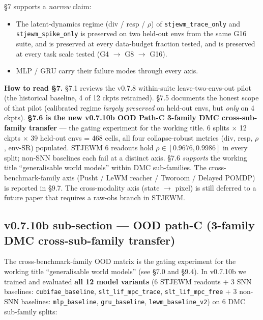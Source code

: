 \documentclass{article}
\begin{document}
§7 supports a \emph{narrow} claim:
\begin{itemize}
\item The latent-dynamics regime (div / resp / $\rho$) of \texttt{stjewm\_trace\_only}
and \texttt{stjewm\_spike\_only} is preserved on two held-out envs from the
same G16 suite, and is preserved at every data-budget fraction
tested, and is preserved at every task scale tested (G4 $\to$ G8 $\to$ G16).
\item MLP / GRU carry their failure modes through every axis.
\end{itemize}

\textbf{How to read §7.} §7.1 reviews the v0.7.8 within-suite leave-two-envs-out
pilot (the historical baseline, 4 of 12 ckpts retrained). §7.5
documents the honest scope of that pilot (calibrated regime \emph{largely
preserved} on held-out envs, but \emph{only} on 4 ckpts). \textbf{§7.6 is
the new v0.7.10b OOD Path-C 3-family DMC cross-sub-family transfer}
--- the gating experiment for the working title. 6 splits $\times$ 12 ckpts
$\times$ 39 held-out envs = 468 cells, all four collapse-robust metrics
(div, resp, $\rho$, env-SR) populated. STJEWM 6 readouts hold
\texttt{$\rho \in [0.9676, 0.9986]$} in every split; non-SNN baselines each
fail at a distinct axis. §7.6 \emph{supports} the working title
``generalisable world models'' within DMC sub-families. The cross-
benchmark-family axis (Pusht / LeWM reacher / Tworoom / Delayed
POMDP) is reported in §9.7. The cross-modality axis (state $\to$ pixel) is still
deferred to a future paper that requires a raw-obs branch in STJEWM.

\subsection{v0.7.10b sub-section --- OOD path-C (3-family DMC cross-sub-family transfer)}

The cross-benchmark-family OOD matrix is the gating experiment for the
working title ``generalisable world models'' (see §7.0 and §9.4). In
v0.7.10b we trained and evaluated \textbf{all 12 model variants}
(6 STJEWM readouts + 3 SNN baselines:
\texttt{cubifae\_baseline}, \texttt{slt\_lif\_mpc\_trace},
\texttt{slt\_lif\_mpc\_free} + 3 non-SNN baselines:
\texttt{mlp\_baseline}, \texttt{gru\_baseline},
\texttt{lewm\_baseline\_v2}) on 6 DMC sub-family splits:
\end{document}
